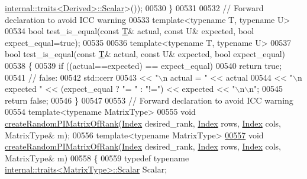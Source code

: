 \begin{DoxyCode}
      \hyperlink{struct_eigen_1_1internal_1_1traits}{internal::traits<Derived>::Scalar}>());
00530 \}
00531 
00532 \textcolor{comment}{// Forward declaration to avoid ICC warning}
00533 \textcolor{keyword}{template}<\textcolor{keyword}{typename} T, \textcolor{keyword}{typename} U>
00534 \textcolor{keywordtype}{bool} test\_is\_equal(\textcolor{keyword}{const} \hyperlink{group___sparse_core___module}{T}& actual, \textcolor{keyword}{const} U& expected, \textcolor{keywordtype}{bool} expect\_equal=\textcolor{keyword}{true});
00535 
00536 \textcolor{keyword}{template}<\textcolor{keyword}{typename} T, \textcolor{keyword}{typename} U>
00537 \textcolor{keywordtype}{bool} test\_is\_equal(\textcolor{keyword}{const} \hyperlink{group___sparse_core___module}{T}& actual, \textcolor{keyword}{const} U& expected, \textcolor{keywordtype}{bool} expect\_equal)
00538 \{
00539     \textcolor{keywordflow}{if} ((actual==expected) == expect\_equal)
00540         \textcolor{keywordflow}{return} \textcolor{keyword}{true};
00541     \textcolor{comment}{// false:}
00542     std::cerr
00543         << \textcolor{stringliteral}{"\(\backslash\)n    actual   = "} << actual
00544         << \textcolor{stringliteral}{"\(\backslash\)n    expected "} << (expect\_equal ? \textcolor{stringliteral}{"= "} : \textcolor{stringliteral}{"!="}) << expected << \textcolor{stringliteral}{"\(\backslash\)n\(\backslash\)n"};
00545     \textcolor{keywordflow}{return} \textcolor{keyword}{false};
00546 \}
00547 
00553 \textcolor{comment}{// Forward declaration to avoid ICC warning}
00554 \textcolor{keyword}{template}<\textcolor{keyword}{typename} MatrixType>
00555 \textcolor{keywordtype}{void} \hyperlink{namespace_eigen_a0d9a7ddcee5c7c8defaba3628455efb2}{createRandomPIMatrixOfRank}(\hyperlink{namespace_eigen_a62e77e0933482dafde8fe197d9a2cfde}{Index} desired\_rank, 
      \hyperlink{namespace_eigen_a62e77e0933482dafde8fe197d9a2cfde}{Index} rows, \hyperlink{namespace_eigen_a62e77e0933482dafde8fe197d9a2cfde}{Index} cols, MatrixType& m);
00556 \textcolor{keyword}{template}<\textcolor{keyword}{typename} MatrixType>
\hyperlink{namespace_eigen_a0d9a7ddcee5c7c8defaba3628455efb2}{00557} \textcolor{keywordtype}{void} \hyperlink{namespace_eigen_a0d9a7ddcee5c7c8defaba3628455efb2}{createRandomPIMatrixOfRank}(\hyperlink{namespace_eigen_a62e77e0933482dafde8fe197d9a2cfde}{Index} desired\_rank, 
      \hyperlink{namespace_eigen_a62e77e0933482dafde8fe197d9a2cfde}{Index} rows, \hyperlink{namespace_eigen_a62e77e0933482dafde8fe197d9a2cfde}{Index} cols, MatrixType& m)
00558 \{
00559   \textcolor{keyword}{typedef} \textcolor{keyword}{typename} \hyperlink{struct_eigen_1_1internal_1_1traits}{internal::traits<MatrixType>::Scalar} Scalar;

\end{DoxyCode}
